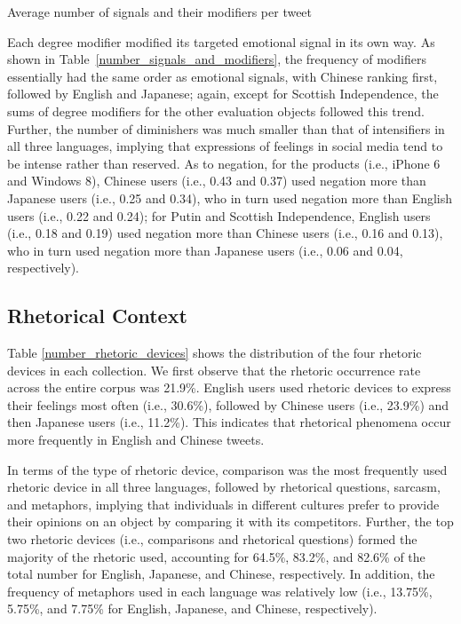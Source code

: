 \documentclass[english]{jnlp_1.4}
\begin{document}
\begin{table}[t]
\caption{Average number of signals and their modifiers per tweet}
\label{number_signals_and_modifiers}

\end{table}

Each degree modifier modified its targeted emotional signal in its own way. As shown in Table~\ref{number_signals_and_modifiers}, the frequency of modifiers essentially had the same order as emotional signals, with Chinese ranking first, followed by English and Japanese; again, except for Scottish Independence, the sums of degree modifiers for the other evaluation objects followed this trend. Further, the number of diminishers was much smaller than that of intensifiers in all three languages, implying that expressions of feelings in social media tend to be intense rather than reserved. As to negation, for the products (i.e., iPhone 6 and Windows 8), Chinese users (i.e., 0.43 and 0.37) used negation more than Japanese users (i.e., 0.25 and 0.34), who in turn used negation more than English users (i.e., 0.22 and 0.24); for Putin and Scottish Independence, English users (i.e., 0.18 and 0.19) used negation more than Chinese users (i.e., 0.16 and 0.13), who in turn used negation more than Japanese users (i.e., 0.06 and 0.04, respectively).


\subsection{Rhetorical Context}

Table \ref{number_rhetoric_devices} shows the distribution of the four rhetoric devices in each collection. We first observe that the rhetoric occurrence rate across the entire corpus was 21.9\%. English users used rhetoric devices to express their feelings most often (i.e., 30.6\%), followed by Chinese users (i.e., 23.9\%) and then Japanese users (i.e., 11.2\%). This indicates that rhetorical phenomena occur more frequently in English and Chinese tweets.

In terms of the type of rhetoric device, comparison was the most frequently used rhetoric device in all three languages, followed by rhetorical questions, sarcasm, and metaphors, implying that individuals in different cultures prefer to provide their opinions on an object by comparing it with its competitors. Further, the top two rhetoric devices (i.e., comparisons and rhetorical questions) formed the majority of the rhetoric used, accounting for 64.5\%, 83.2\%, and 82.6\% of the total number for English, Japanese, and Chinese, respectively. In addition, the frequency of metaphors used in each language was relatively low (i.e., 13.75\%, 5.75\%, and 7.75\% for English, Japanese, and Chinese, respectively). 
\end{document}
